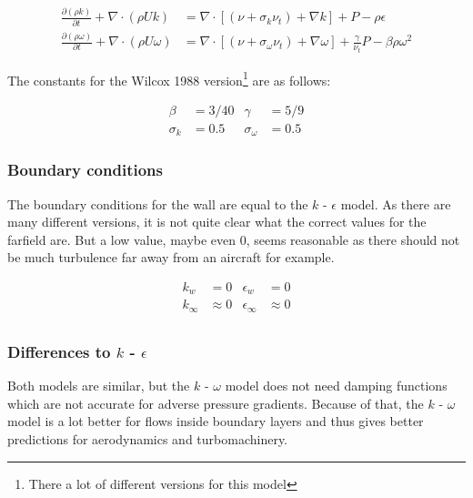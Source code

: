 \begin{align}
    \label{eq:transport_k_omega}
    \frac{\partial (\rho k)}{\partial t} + 
    \nabla \cdot (\rho U k) &=
    \nabla \cdot \left[ 
        \left( \nu + \sigma_k \nu_t \right) + \nabla k 
    \right] + P - \rho \epsilon \\
%
    \label{eq:tranport_epsilon_omega}
    \frac{\partial (\rho \omega)}{\partial t} + 
    \nabla \cdot (\rho U \omega) &=
    \nabla \cdot \left[ 
        \left( \nu + \sigma_{\omega} \nu_t \right) + \nabla  \omega
    \right] + \frac{\gamma}{\nu_t} P - \beta \rho \omega^2
\end{align}

\noindent The constants for the Wilcox 1988 version\footnote{There a lot of
different versions for this model} are as follows: \cite{nasatmr}

\begin{align*}
    \beta       &= 3/40     & \gamma            &= 5/9\\
    \sigma_k    &= 0.5      & \sigma_{\omega}   &= 0.5
\end{align*}


\subsubsection{Boundary conditions}
The boundary conditions for the wall are equal to the $k$ - $\epsilon$ model.
As there are many different versions, it is not quite clear what the correct
values for the farfield are. But a low value, maybe even 0, seems reasonable as
there should not be much turbulence far away from an aircraft for example.
\cite{cfd101_k-omega}

\begin{align*}
    k_{w}        &= 0           &\epsilon_{w}       &= 0 \\
    k_{\infty}   &\approx 0     &\epsilon_{\infty}  &\approx 0 \\
\end{align*}


\subsubsection{Differences to $k$ - $\epsilon$}
Both models are similar, but the $k$ - $\omega$ model does not need damping
functions which are not accurate for adverse pressure gradients. Because of
that, the $k$ - $\omega$ model is a lot better for flows inside boundary layers
and thus gives better predictions for aerodynamics and turbomachinery.


